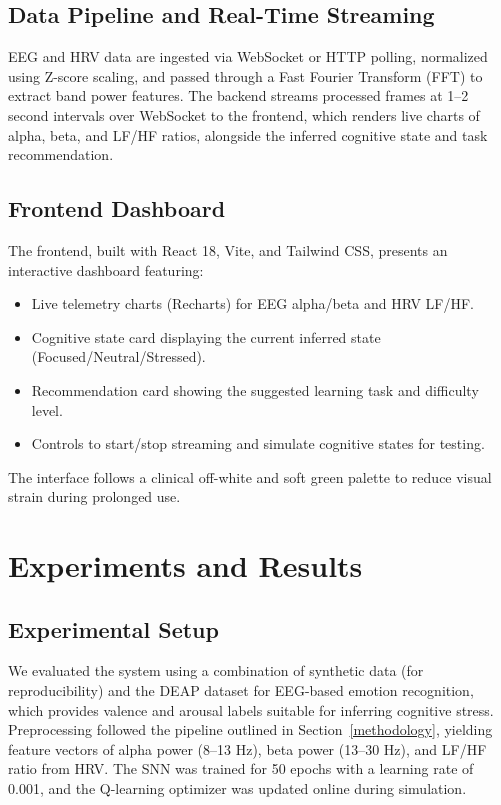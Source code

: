 \documentclass[conference]{IEEEtran}
\begin{document}
\subsection{Data Pipeline and Real-Time Streaming}
EEG and HRV data are ingested via WebSocket or HTTP polling, normalized using Z-score scaling, and passed through a Fast Fourier Transform (FFT) to extract band power features. The backend streams processed frames at 1–2 second intervals over WebSocket to the frontend, which renders live charts of alpha, beta, and LF/HF ratios, alongside the inferred cognitive state and task recommendation.

\subsection{Frontend Dashboard}
The frontend, built with React 18, Vite, and Tailwind CSS, presents an interactive dashboard featuring:
\begin{itemize}
\item Live telemetry charts (Recharts) for EEG alpha/beta and HRV LF/HF.
\item Cognitive state card displaying the current inferred state (Focused/Neutral/Stressed).
\item Recommendation card showing the suggested learning task and difficulty level.
\item Controls to start/stop streaming and simulate cognitive states for testing.
\end{itemize}
The interface follows a clinical off-white and soft green palette to reduce visual strain during prolonged use.

\section{Experiments and Results}
\label{experiments}
\subsection{Experimental Setup}
We evaluated the system using a combination of synthetic data (for reproducibility) and the DEAP dataset \cite{deap2012} for EEG-based emotion recognition, which provides valence and arousal labels suitable for inferring cognitive stress. Preprocessing followed the pipeline outlined in Section~\ref{methodology}, yielding feature vectors of alpha power (8–13 Hz), beta power (13–30 Hz), and LF/HF ratio from HRV. The SNN was trained for 50 epochs with a learning rate of 0.001, and the Q-learning optimizer was updated online during simulation.
\end{document}
